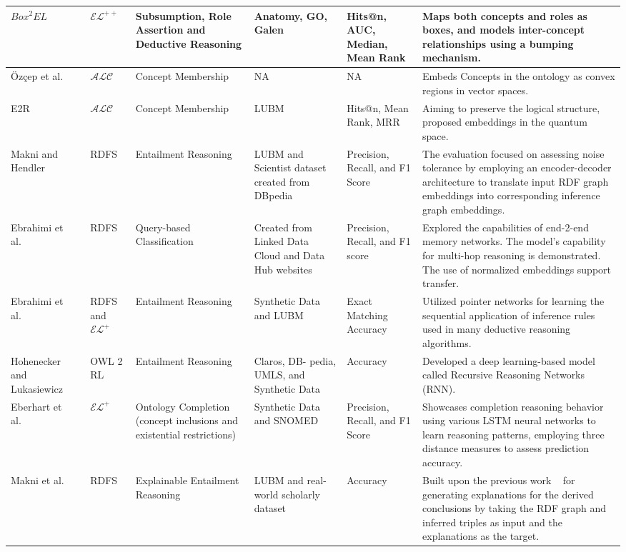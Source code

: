 {\begin{longtable}{|p{2.2cm}|p{1.2cm}|p{2.4cm}|p{2.0cm}|p{2.0cm}|p{4.0cm}|}
$Box^2EL$~\cite{dualboxembeddings} & $\mathcal{EL}^{++}$ & Subsumption, Role Assertion and Deductive Reasoning & Anatomy, GO, Galen & Hits@n, AUC, Median, Mean Rank & Maps both
concepts and roles as boxes, and
models inter-concept relationships using a bumping mechanism. \\
\hline
{\"{O}}z{\c{c}}ep et al.~\cite{cone_semantics} & $\mathcal{ALC}$ & Concept Membership & NA&NA & Embeds Concepts in the ontology as convex
regions in vector spaces. \\
\hline
E2R~\cite{QuantumEmbedding} & $\mathcal{ALC}$ & Concept Membership & LUBM& Hits@n, Mean Rank, MRR & Aiming to preserve the logical structure, proposed embeddings in the quantum space.\\
\hline
Makni and Hendler~\cite{noise-tolerant} & RDFS & Entailment Reasoning & LUBM and Scientist dataset created from DBpedia&Precision, Recall, and F1 Score & The evaluation focused on assessing noise tolerance by employing an encoder-decoder architecture to translate input RDF graph embeddings into corresponding inference graph embeddings. \\
\hline
Ebrahimi et al.~\cite{Ebrahimi2018ReasoningOR} & RDFS & Query-based Classification & Created from Linked Data Cloud and Data Hub websites& Precision, Recall, and F1 score & Explored the capabilities of end-2-end memory networks. The model's capability for multi-hop reasoning is demonstrated. The use of normalized embeddings support transfer. \\
\hline
Ebrahimi et al.~\cite{pointer_nw} & RDFS and $\mathcal{EL}^{+}$ & Entailment Reasoning & Synthetic Data and LUBM & Exact Matching Accuracy & Utilized pointer networks for learning the sequential application of inference rules used in many deductive reasoning algorithms.\\
\hline
Hohenecker and Lukasiewicz~\cite{patrick} & OWL 2 RL & Entailment Reasoning & Claros, DB-
pedia, UMLS, and Synthetic Data& Accuracy& Developed a deep learning-based model called Recursive Reasoning Networks (RNN).\\
\hline
Eberhart et al.~\cite{emulation} & $\mathcal{EL}^{+}$ & Ontology Completion (concept inclusions and existential restrictions) & Synthetic Data and SNOMED & Precision, Recall, and F1 Score & Showcases completion reasoning behavior using various LSTM neural networks to learn reasoning patterns, employing three distance measures to assess prediction accuracy. \\
\hline
Makni et al.~\cite{Explainable_rdfs_reasoning} & RDFS & Explainable Entailment Reasoning & LUBM and real-world scholarly dataset & Accuracy& Built upon the previous work ~\cite{noise-tolerant} for generating explanations for the derived conclusions by taking the RDF graph and inferred triples as input and the explanations as the target. \\

\end{longtable}}
